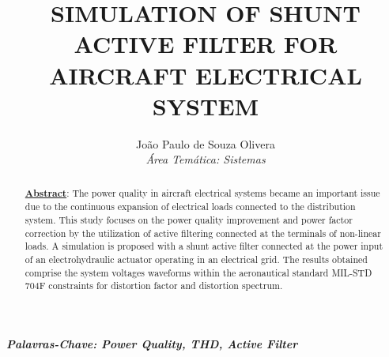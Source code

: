 \documentclass[]{seti2}
\title{\uppercase{Simulation of Shunt Active Filter for Aircraft Electrical System}}
\author{
					João Paulo de Souza Olivera\\
					{\normalsize\itshape Área Temática: Sistemas}\\
				}
\begin{document}
\maketitle

\begin{abstract}
		\underline{\textbf{Abstract}}: The power quality in aircraft electrical systems became an important issue due to the continuous expansion of electrical loads connected to the distribution system. This study focuses on the power quality improvement and power factor correction by the utilization of active filtering connected at the terminals of non-linear loads. A simulation is proposed with a shunt active filter connected at the power input of an electrohydraulic actuator operating in an electrical grid. The results obtained comprise the system voltages waveforms within the aeronautical standard MIL-STD 704F constraints for distortion factor and distortion spectrum.
\end{abstract}

\textbf{\textit{Palavras-Chave: Power Quality, THD, Active Filter}}








\newpage

\end{document}
